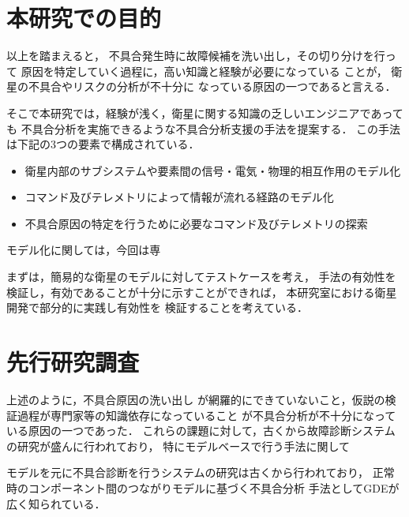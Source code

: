 \documentclass[11pt]{article}
\begin{document}

\section{本研究での目的}
以上を踏まえると，
不具合発生時に故障候補を洗い出し，その切り分けを行って
原因を特定していく過程に，高い知識と経験が必要になっている
ことが，
衛星の不具合やリスクの分析が不十分に
なっている原因の一つであると言える．

そこで本研究では，経験が浅く，衛星に関する知識の乏しいエンジニアであっても
不具合分析を実施できるような不具合分析支援の手法を提案する．
この手法は下記の3つの要素で構成されている．
\begin{itemize}
   \item 衛星内部のサブシステムや要素間の信号・電気・物理的相互作用のモデル化
   \item コマンド及びテレメトリによって情報が流れる経路のモデル化
   \item 不具合原因の特定を行うために必要なコマンド及びテレメトリの探索 %
\end{itemize}
   
モデル化に関しては，今回は専

まずは，簡易的な衛星のモデルに対してテストケースを考え，
手法の有効性を検証し，有効であることが十分に示すことができれば，
本研究室における衛星開発で部分的に実践し有効性を
検証することを考えている．\\

\section{先行研究調査}
上述のように，不具合原因の洗い出し
が網羅的にできていないこと，仮説の検証過程が専門家等の知識依存になっていること
が不具合分析が不十分になっている原因の一つであった．%
これらの課題に対して，古くから故障診断システムの研究が盛んに行われており，
特にモデルベースで行う手法に関して

モデルを元に不具合診断を行うシステムの研究は古くから行われており，\cite{}
正常時のコンポーネント間のつながりモデルに基づく不具合分析
手法としてGDEが広く知られている．
\end{document}
